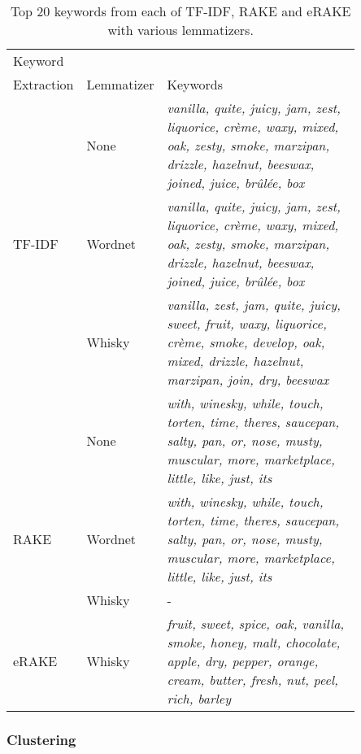 \begin{table}[h!]
    \centering
    \caption{Top 20 keywords from each of TF-IDF, RAKE and eRAKE with various lemmatizers.}\label{tab:top20}
    \begin{tabular}{p{0.15\linewidth} p{0.1\linewidth} p{0.6\linewidth}} 
    \toprule
    Keyword \\Extraction & Lemmatizer & Keywords                                                                                                                                                       \\
    \midrule
                 & None       & \textit{vanilla, quite, juicy, jam, zest, liquorice, crème, waxy, mixed, oak, zesty, smoke, marzipan, drizzle, hazelnut, beeswax, joined, juice, brûlée, box}  \\
    TF-IDF             & Wordnet    & \textit{vanilla, quite, juicy, jam, zest, liquorice, crème, waxy, mixed, oak, zesty, smoke, marzipan, drizzle, hazelnut, beeswax, joined, juice, brûlée, box}  \\
                 & Whisky     & \textit{vanilla, zest, jam, quite, juicy, sweet, fruit, waxy, liquorice, crème, smoke, develop, oak, mixed, drizzle, hazelnut, marzipan, join, dry, beeswax}   \\
    \midrule
                   & None       & \textit{with, winesky, while, touch, torten, time, theres, saucepan, salty, pan, or, nose, musty, muscular, more, marketplace, little, like, just, its}        \\
    RAKE               & Wordnet    & \textit{with, winesky, while, touch, torten, time, theres, saucepan, salty, pan, or, nose, musty, muscular, more, marketplace, little, like, just, its}        \\
                   & Whisky     & -                                                                                                                                                              \\
    \midrule
    eRAKE              & Whisky     & \textit{fruit, sweet, spice, oak, vanilla, smoke, honey, malt, chocolate, apple, dry, pepper, orange, cream, butter, fresh, nut, peel, rich, barley}           \\
    \bottomrule
    \end{tabular}
\end{table}

\subsubsection{Clustering}

